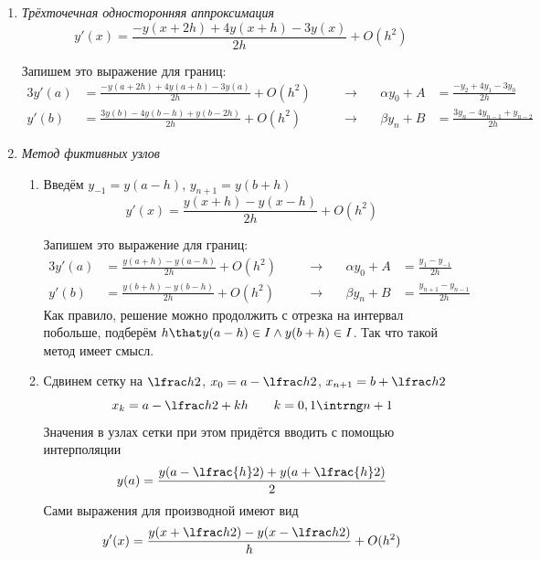 \documentclass{trlnotes}
\begin{document}
\begin{enumerate}
  \item \emph{Трёхточечная односторонняя аппроксимация}
      \begin{equation*}
        y'(x) = \frac{-y(x+2h) + 4y(x+h) - 3 y(x)}{2h} + O(h^2)
      \end{equation*}

      Запишем это выражение для границ:
      \begin{alignat*}{3}
        y'(a) &= \frac{-y(a+2h) + 4y(a+h) - 3 y(a)}{2h} + O(h^2) 
              &\quad&\to\quad &
        αy_0 + A &= \frac{-y_2 + 4 y_1 - 3y_0}{2h}\\
        y'(b) &= \frac{3y(b) - 4y(b-h) + y(b-2h)}{2h} + O(h^2) 
              &\quad&\to\quad &
        βy_n + B &= \frac{3y_n - 4 y_{n-1} + y_{n-2}}{2h}
      \end{alignat*}
    \item \emph{Метод фиктивных узлов}
      \begin{enumerate}
        \item Введём $y_{-1} = y(a-h)$, $y_{n+1} = y(b+h)$
          \begin{equation*}
            y'(x) = \frac{y(x+h) - y(x-h)}{2h} + O(h^2)
          \end{equation*}

          Запишем это выражение для границ:
          \begin{alignat*}{3}
            y'(a) &= \frac{y(a+h) - y(a-h)}{2h} + O(h^2) 
                  &\quad&\to\quad &
            αy_0 + A &= \frac{y_1 - y_{-1}}{2h}\\
            y'(b) &= \frac{y(b+h) - y(b-h)}{2h} + O(h^2) 
                  &\quad&\to\quad &
            βy_n + B &= \frac{y_{n+1} - y_{n-1}}{2h}
          \end{alignat*}
          Как правило, решение можно продолжить с отрезка на интервал побольше, подберём
          $h \that y(a-h) \in I \land y(b+h) \in I$. Так что такой метод имеет смысл.
        \item Сдвинем сетку на $\lfrac h2$, $x_0 = a-\lfrac h2$, $x_{n+1} = b+\lfrac h2$
          \[
            x_k = a- \lfrac h2 + kh \qquad k = 0,1 \intrng n+1
          \]
          Значения в узлах сетки при этом придётся вводить с помощью интерполяции
          \[
            y(a) = \frac{y(a-\lfrac{h}2) + y(a+\lfrac{h}2)}{2}
          \]
          Сами выражения для производной имеют вид
          \begin{equation*}
            y'(x) = \frac{y(x+\lfrac h2) - y(x-\lfrac h2)}{h} + O(h^2)
          \end{equation*}


\end{enumerate}
\end{enumerate}
\end{document}
